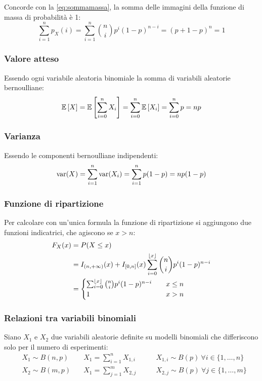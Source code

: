 Concorde con la \eqref{eq:sommamassa}, la somma delle immagini della funzione di massa di probabilità è 1:
\begin{equation*}
	\sum_{i=1}^n p_X(i) = \sum_{i=1}^n \binom{n}{i} p^i(1-p)^{n-i} = (p+1-p)^n = 1
\end{equation*}


\subsubsection{Valore atteso}
Essendo ogni variabile aleatoria binomiale la somma di variabili aleatorie bernoulliane:
\begin{equation}
	\mathbb{E}\left[ X \right] = \mathbb{E}\left[ \sum_{i=0}^n X_i \right] = \sum_{i=0}^n \mathbb{E}\left[ X_i \right] = \sum_{i=0}^n p = np
\end{equation}


\subsubsection{Varianza}
Essendo le componenti bernoulliane indipendenti:
\begin{equation}
	\operatorname{var}(X)=\sum_{i=1}^n \operatorname{var}(X_i) = \sum_{i=1}^n p(1-p) = np(1-p)
\end{equation}


\subsubsection{Funzione di ripartizione}
Per calcolare con un'unica formula la funzione di ripartizione si aggiungono due funzioni indicatrici, che agiscono se $x>n$:
\begin{align}
	F_X(x) & = P(X\leq x)                                                                           \nonumber            \\
	       & = I_{(n,+\infty)}(x) + I_{[0,n]}(x) \sum_{i=0}^{\left\lfloor x \right\rfloor}\binom{n}{i} p^i (1-p)^{n-i} \label{eq:ripabinom} \\
	       & = \begin{cases}
		\sum_{i=0}^{\left\lfloor x \right\rfloor}\binom{n}{i} p^i (1-p)^{n-i}\quad & x\leq n \\
		1                                                       & x>n     \\
	\end{cases} \nonumber
\end{align}

\subsubsection{Relazioni tra variabili binomiali}
Siano $X_1$ e $X_2$ due variabili aleatorie definite su modelli binomiali che differiscono solo per il numero di esperimenti:
\begin{align*}
	 & X_1\sim B(n, p)\quad & X_1=\sum_{i=1}^n X_{1,i}\qquad & X_{1,i}\sim B(p)~\forall i\in\{1,\dots,n\} \\
	 & X_2\sim B(m, p)\quad & X_1=\sum_{j=1}^m X_{2,j}\qquad & X_{2,j}\sim B(p)~\forall j\in\{1,\dots,m\}
\end{align*}

